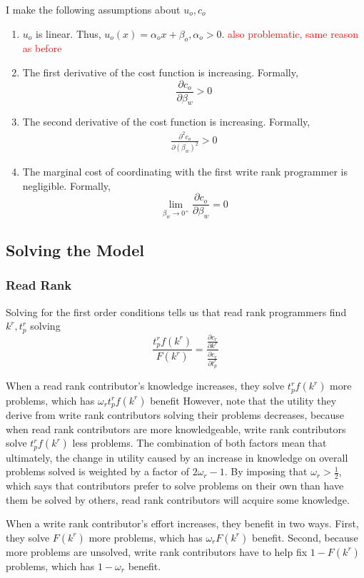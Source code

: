 \documentclass[source/paper/main.tex]{subfiles}
\begin{document}
I make the following assumptions about $u_o, c_o$
\begin{enumerate}
    \item $u_o$ is linear. Thus, $u_o(x) = \alpha_ox + \beta_o, \alpha_o > 0$.
    \textcolor{red}{also problematic, same reason as before}
    \item The first derivative of the cost function is increasing. Formally, 
    $$\frac{\partial c_o}{\partial \beta_w}>0$$
    \item  The second derivative of the cost function is increasing. Formally, 
    \begin{align}
        \frac{\partial^2 c_o}{\partial (\beta_w)^2}>0 \label{org_concave_cost}
    \end{align}
    \item The marginal cost of coordinating with the first write rank programmer is negligible. Formally,
    $$\lim_{\beta_w \to 0^+} \frac{\partial c_o}{\partial \beta_w} = 0 $$
\end{enumerate}

\subsection{Solving the Model}
\subsubsection{Read Rank}
Solving for the first order conditions tells us that read rank programmers find $k^r, t_p^r$ solving 
$$\frac{t_p^rf(k^r)}{F(k^r)} = \frac{\frac{\partial c_r}{\partial k^r}}{\frac{\partial c_r}{\partial t_p^r}}$$

When a read rank contributor's knowledge increases, they solve $t_p^r f(k^r)$ more problems, which has $\omega_r t_p^r f(k^r)$ benefit However, note that the utility they derive from write rank contributors solving their problems decreases, because when read rank contributors are more knowledgeable, write rank contributors solve $t_p^r f(k^r)$ less problems. The combination of both factors mean that ultimately, the change in utility caused by an increase in knowledge on overall problems solved is weighted by a factor of $2\omega_r - 1$. By imposing that $\omega_r>\frac12$, which says that contributors prefer to solve problems on their own than have them be solved by others, read rank contributors will acquire some knowledge. 

When a write rank contributor's effort increases, they benefit in two ways. First, they solve $F(k^r)$ more problems, which has $\omega_r F(k^r)$ benefit. Second, because more problems are unsolved, write rank contributors have to help fix $1-F(k^r)$ problems, which has $1-\omega_r$ benefit.
\end{document}
